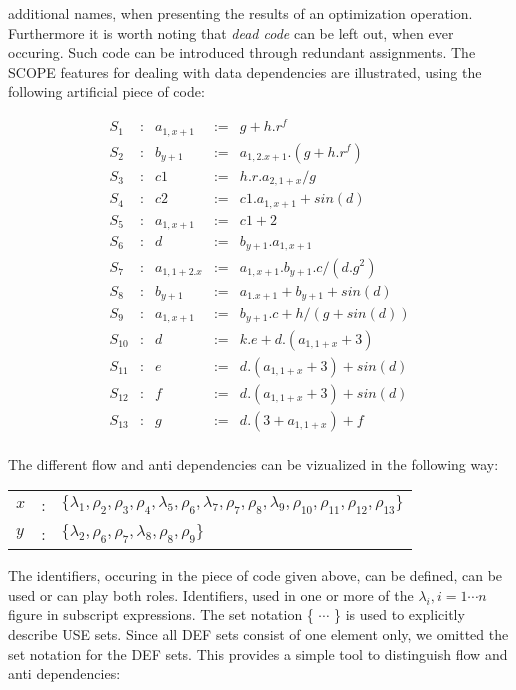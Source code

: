 additional names, when presenting the results of an optimization operation.
Furthermore it is worth noting that {\em dead code} can be left out, when
ever occuring. Such code can be introduced through redundant assignments.
The SCOPE features for dealing with data dependencies are illustrated, using 
the following artificial piece of code:
\begin{center}
\[ \begin{array}{lclcl}
 S_1 & : & a_{1,x+1} & := & g + h . r^f \\
 S_2 & : & b_{y+1} & := & a_{1, 2.x+1} .(g + h . r^f) \\
 S_3 & : & c1 & := &  h.r. a_{2,1+x}/g \\
 S_4 & : & c2 & := & c1 . a_{1,x+1} + sin(d) \\
 S_5 & : & a_{1,x+1} & := & c1 + 2 \\
 S_6 & : & d & := & b_{y+1} . a_{1,x+1} \\
 S_7 & : & a_{1,1+2.x} & := & a_{1,x+1} . b_{y+1} . c/(d . g^2)  \\
 S_8 & : & b_{y+1} & := & a_{1.x+1} + b_{y+1} + sin(d) \\
 S_9 & : & a_{1,x+1} & := & b_{y+1} . c + h/(g  + sin(d))\\
 S_{10} & : & d & := & k . e + d . (a_{1,1+x} + 3) \\
 S_{11} & : & e & := &  d . (a_{1,1+x} + 3) + sin(d) \\
 S_{12} & : & f & := &  d . (a_{1,1+x} + 3) + sin(d) \\
 S_{13} & : & g & := &  d . (3 + a_{1,1+x}) + f \\
\end{array}\]
\end{center}

The different flow and anti dependencies can be vizualized in the following way:
\begin{center}
\begin{tabular}{lcl}
 $x$ & : & $\{ {\lambda}_1 , {\rho}_2 , {\rho}_3 , {\rho}_4 , {\lambda}_5 ,
 {\rho}_6 , {\lambda}_7 , {\rho}_7 , {\rho}_8 ,{\lambda}_9 , {\rho}_{10} ,
 {\rho}_{11} , {\rho}_{12} , {\rho}_{13} \}$ \\
 $y$ & : & $\{ {\lambda}_2 , {\rho}_6 , {\rho}_7 , {\lambda}_8 , {\rho}_8 ,
 {\rho}_9 \}$ 
\end{tabular}
\end{center}

The identifiers, occuring in the piece of code given above, can be defined,
can be used or can play both roles. Identifiers, used in one or more of the
$\lambda_i , i = 1 \cdots n$ figure in subscript expressions. The set 
notation \{ $\cdots$ \} is used to explicitly describe USE sets. Since
all DEF sets consist of one element only, we omitted the set notation for the
DEF sets. This provides a simple tool to distinguish flow and anti dependencies:

